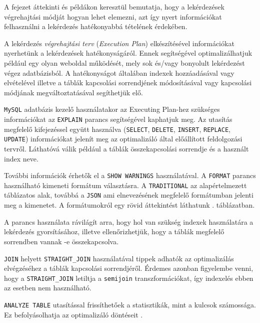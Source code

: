 
A fejezet áttekinti és példákon keresztül bemutatja, hogy a lekérdezések végrehajtási módját hogyan lehet elemezni, azt így nyert információkat felhasználni a lekérdezés hatékonyabbá tételének érdekében.

A lekérdezés \textit{végrehajtási terv} (\textit{Execution Plan}) elkészítésével információkat nyerhetünk a lekérdezések hatékonyságáról. Ennek segítségével optimalizálhatjuk például egy olyan weboldal működését, mely sok és/vagy bonyolult lekérdezést végez adatbázisból. A hatékonyságot általában indexek hozzáadásával vagy elvételével illetve a táblák kapcsolási sorrendjének módosításával vagy kapcsolási módjának megváltoztatásával segíthetjük elő.


\texttt{MySQL} adatbázis kezelő használatakor az Executing Plan-hez szükséges információkat az \texttt{EXPLAIN} parancs segítségével kaphatjuk meg.
Az utasítás megfelelő kifejezéssel együtt használva (\texttt{SELECT}, \texttt{DELETE}, \texttt{INSERT}, \texttt{REPLACE}, \texttt{UPDATE})  információkat jelenít meg az optimalizáló által előállított feldolgozási tervről. Láthatóvá válik például a táblák összekapcsolási sorrendje és a használt index neve.

További információk érhetők el a \texttt{SHOW WARNINGS} használatával.
A \texttt{FORMAT} parancs használható kimeneti formátum választásra. A \texttt{TRADITIONAL} az alapértelmezett táblázatos alak, továbbá a \texttt{JSON} ami elnevezésének megfelelő formátumban jelenti meg a kimenetet. A formátumokról egy rövid áttekintést láthatunk . táblázatban.

A parancs használata rávilágít arra, hogy hol van szükség indexek használatára a lekérdezés gyorsításához, illetve ellenőrizhetjük, hogy a táblák megfelelő sorrendben vannak -e összekapcsolva. 

\texttt{JOIN} helyett \texttt{STRAIGHT\_JOIN} használatával tippek adhatók az optimalizálás elvégzéséhez a táblák kapcsolási sorrendjéről. Érdemes azonban figyelembe venni, hogy a \texttt{STRAIGHT\_JOIN} letiltja a \texttt{semijoin} transzformációkat, így indexelés ebben az esetben nem használható.

\texttt{ANALYZE TABLE} utasítással frissíthetőek a statisztikák, mint a kulcsok számossága. Ez befolyásolhatja az optimalizáló döntéseit \cite{explain}.


